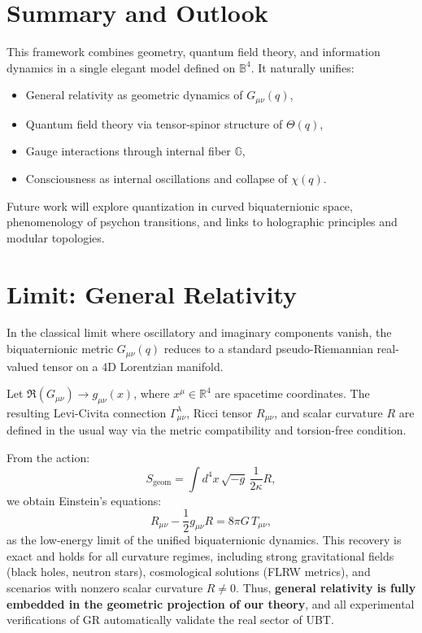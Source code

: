 \documentclass[12pt]{article}
\begin{document}
\section{Summary and Outlook}

This framework combines geometry, quantum field theory, and information dynamics in a single elegant model defined on \( \mathbb{B}^4 \). It naturally unifies:

\begin{itemize}
  \item General relativity as geometric dynamics of \( G_{\mu\nu}(q) \),
  \item Quantum field theory via tensor-spinor structure of \( \Theta(q) \),
  \item Gauge interactions through internal fiber \( \mathbb{G} \),
  \item Consciousness as internal oscillations and collapse of \( \chi(q) \).
\end{itemize}

Future work will explore quantization in curved biquaternionic space, phenomenology of psychon transitions, and links to holographic principles and modular topologies.

\section{Limit: General Relativity}

In the classical limit where oscillatory and imaginary components vanish, the biquaternionic metric \( G_{\mu\nu}(q) \) reduces to a standard pseudo-Riemannian real-valued tensor on a 4D Lorentzian manifold.

Let \( \Re(G_{\mu\nu}) \rightarrow g_{\mu\nu}(x) \), where \( x^\mu \in \mathbb{R}^4 \) are spacetime coordinates. The resulting Levi-Civita connection \( \Gamma^\lambda_{\mu\nu} \), Ricci tensor \( R_{\mu\nu} \), and scalar curvature \( R \) are defined in the usual way via the metric compatibility and torsion-free condition.

From the action:
\[
S_\text{geom} = \int d^4 x \, \sqrt{-g} \, \frac{1}{2\kappa} R,
\]
we obtain Einstein’s equations:
\[
R_{\mu\nu} - \frac{1}{2} g_{\mu\nu} R = 8 \pi G \, T_{\mu\nu},
\]
as the low-energy limit of the unified biquaternionic dynamics. This recovery is exact and holds for all curvature regimes, including strong gravitational fields (black holes, neutron stars), cosmological solutions (FLRW metrics), and scenarios with nonzero scalar curvature $R \neq 0$. Thus, \textbf{general relativity is fully embedded in the geometric projection of our theory}, and all experimental verifications of GR automatically validate the real sector of UBT.
\end{document}
